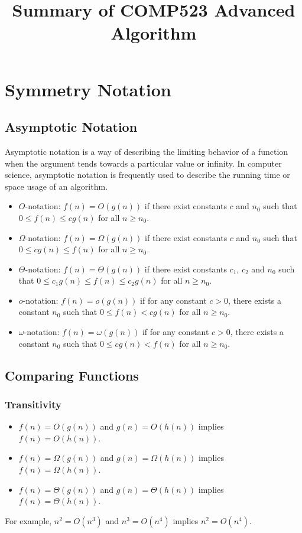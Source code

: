 \documentclass[onecolumn]{report}
\begin{document}
\title{Summary of COMP523 Advanced Algorithm}
\maketitle
\chapter{Symmetry Notation}
\section{Asymptotic Notation}
Asymptotic notation is a way of describing the limiting behavior of a function when the argument tends towards a particular value or infinity. In computer science, asymptotic notation is frequently used to describe the running time or space usage of an algorithm.\\
\begin{itemize}
\item $O$-notation: $f(n) = O(g(n))$ if there exist constants $c$ and $n_0$ such that $0 \leq f(n) \leq cg(n)$ for all $n \geq n_0$.
\item $\Omega$-notation: $f(n) = \Omega(g(n))$ if there exist constants $c$ and $n_0$ such that $0 \leq cg(n) \leq f(n)$ for all $n \geq n_0$.
\item $\Theta$-notation: $f(n) = \Theta(g(n))$ if there exist constants $c_1$, $c_2$ and $n_0$ such that $0 \leq c_1g(n) \leq f(n) \leq c_2g(n)$ for all $n \geq n_0$.
\item $o$-notation: $f(n) = o(g(n))$ if for any constant $c > 0$, there exists a constant $n_0$ such that $0 \leq f(n) < cg(n)$ for all $n \geq n_0$.
\item $\omega$-notation: $f(n) = \omega(g(n))$ if for any constant $c > 0$, there exists a constant $n_0$ such that $0 \leq cg(n) < f(n)$ for all $n \geq n_0$.
\end{itemize}

\section{Comparing Functions}
\subsection{Transitivity}
\begin{itemize}
\item $f(n) = O(g(n))$ and $g(n) = O(h(n))$ implies $f(n) = O(h(n))$.
\item $f(n) = \Omega(g(n))$ and $g(n) = \Omega(h(n))$ implies $f(n) = \Omega(h(n))$.
\item $f(n) = \Theta(g(n))$ and $g(n) = \Theta(h(n))$ implies $f(n) = \Theta(h(n))$.
\end{itemize}
For example, $n^2 = O(n^3)$ and $n^3 = O(n^4)$ implies $n^2 = O(n^4)$.
\end{document}
